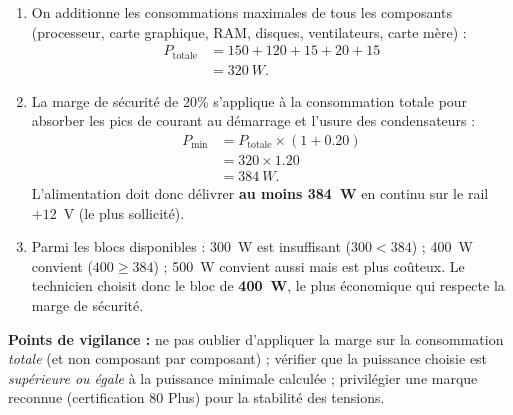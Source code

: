 \documentclass[11pt]{article}
\begin{document}
\begin{corrige}
\begin{enumerate}
  \item On additionne les consommations maximales de tous les composants (processeur, carte graphique, RAM, disques, ventilateurs, carte mère) :
  \begin{align*}
  P_{\text{totale}} &= 150 + 120 + 15 + 20 + 15 \\
  &= \SI{320}{W}.
  \end{align*}
  \item La marge de sécurité de 20\% s'applique à la consommation totale pour absorber les pics de courant au démarrage et l'usure des condensateurs :
  \begin{align*}
  P_{\text{min}} &= P_{\text{totale}} \times (1 + 0.20) \\
  &= 320 \times 1.20 \\
  &= \SI{384}{W}.
  \end{align*}
  L'alimentation doit donc délivrer \textbf{au moins \SI{384}{W}} en continu sur le rail $+12$~V (le plus sollicité).
  \item Parmi les blocs disponibles : \SI{300}{W} est insuffisant ($300 < 384$) ; \SI{400}{W} convient ($400 \geq 384$) ; \SI{500}{W} convient aussi mais est plus coûteux. Le technicien choisit donc le bloc de \textbf{\SI{400}{W}}, le plus économique qui respecte la marge de sécurité.
\end{enumerate}
\textbf{Points de vigilance :} ne pas oublier d'appliquer la marge sur la consommation \emph{totale} (et non composant par composant) ; vérifier que la puissance choisie est \emph{supérieure ou égale} à la puissance minimale calculée ; privilégier une marque reconnue (certification 80 Plus) pour la stabilité des tensions.
\end{corrige}
\end{document}
